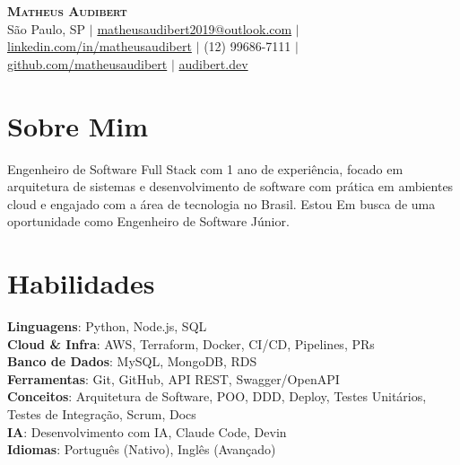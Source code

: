 \documentclass[letterpaper,11pt]{article}
\begin{document}
\begin{center}
    {\Huge \scshape \textcolor{AccentColor}{\textbf{Matheus Audibert}}} \\ \vspace{1pt}
    \small
    São Paulo, SP $|$
    \href{mailto:matheusaudibert2019@outlook.com}{matheusaudibert2019@outlook.com} $|$
    \href{https://www.linkedin.com/in/matheusaudibert}{linkedin.com/in/matheusaudibert} $|$
    (12) 99686-7111 $|$
    \href{https://github.com/matheusaudibert}{github.com/matheusaudibert} $|$
    \href{https://audibert.dev}{audibert.dev}
\end{center}

\section{Sobre Mim}
\begin{itemize}[leftmargin=0.15in, label={}]
\small{\item{
Engenheiro de Software Full Stack com 1 ano de experiência, focado em arquitetura de sistemas e desenvolvimento de software com prática em ambientes cloud e engajado com a área de tecnologia no Brasil. Estou Em busca de uma oportunidade como Engenheiro de Software Júnior.
}}
\end{itemize}

\section{Habilidades}
\begin{itemize}[leftmargin=0.15in, label={}]
\small{\item{
\textbf{Linguagens}: Python, Node.js, SQL \\
\textbf{Cloud \& Infra}: AWS, Terraform, Docker, CI/CD, Pipelines, PRs \\
\textbf{Banco de Dados}: MySQL, MongoDB, RDS \\
\textbf{Ferramentas}: Git, GitHub, API REST, Swagger/OpenAPI \\
\textbf{Conceitos}: Arquitetura de Software, POO, DDD, Deploy, Testes Unitários, Testes de Integração, Scrum, Docs \\
\textbf{IA}: Desenvolvimento com IA, Claude Code, Devin \\
\textbf{Idiomas}: Português (Nativo), Inglês (Avançado)
}}
\end{itemize}

\end{document}

